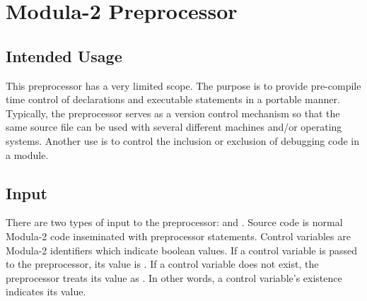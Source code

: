 %
%
%
%

\chapter{Modula-2 Preprocessor}

\section{Intended Usage}

This preprocessor has a very limited scope.  The purpose is to provide
pre-compile time control of declarations and executable statements in a 
portable manner.  Typically, the preprocessor serves as a version control
mechanism so that the same source file can be used with several
different machines and/or operating systems.   Another use is to 
control the inclusion or exclusion of debugging code in a module.

\section{Input}

There are two types of input to the preprocessor: 
and .  Source code is normal Modula-2
code inseminated with preprocessor statements.  Control
variables are Modula-2 identifiers which indicate boolean values.
If a control variable is passed to the preprocessor, its
value is .  If a control variable does not exist,
the preprocessor treats its value as .  In other
words, a control variable's existence indicates its value.

